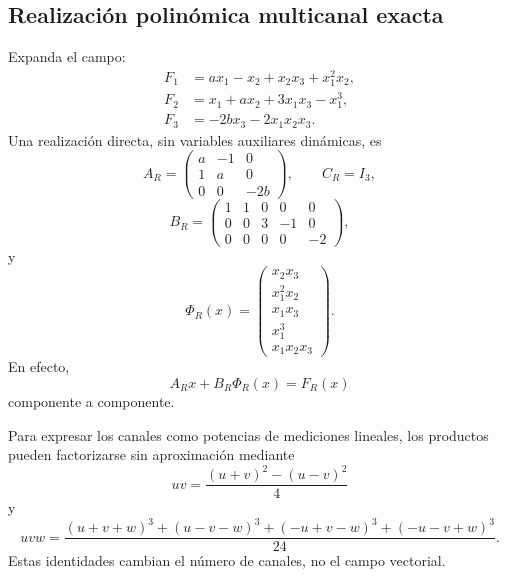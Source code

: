 \subsection{Realización polinómica multicanal exacta}

Expanda el campo:
\begin{align*}
 F_1&=a x_1-x_2+x_2x_3+x_1^2x_2,\\
 F_2&=x_1+a x_2+3x_1x_3-x_1^3,\\
 F_3&=-2b x_3-2x_1x_2x_3.
\end{align*}
Una realización directa, sin variables auxiliares dinámicas, es
\begin{equation}
 A_R=
 \begin{pmatrix}
 a&-1&0\\1&a&0\\0&0&-2b
 \end{pmatrix},\qquad C_R=I_3,
 \label{nc:eq:rf-a}
\end{equation}
\begin{equation}
 B_R=
 \begin{pmatrix}
 1&1&0&0&0\\
 0&0&3&-1&0\\
 0&0&0&0&-2
 \end{pmatrix},
 \label{nc:eq:rf-b}
\end{equation}
y
\begin{equation}
 \Phi_R(x)=
 \begin{pmatrix}
 x_2x_3\\x_1^2x_2\\x_1x_3\\x_1^3\\x_1x_2x_3
 \end{pmatrix}.
 \label{nc:eq:rf-phi}
\end{equation}
En efecto,
\begin{equation}
 A_Rx+B_R\Phi_R(x)=F_R(x)
\end{equation}
componente a componente.

Para expresar los canales como potencias de mediciones lineales, los productos
pueden factorizarse sin aproximación mediante
\begin{equation}
 uv=\frac{(u+v)^2-(u-v)^2}{4}
 \label{nc:eq:square-identity}
\end{equation}
y
\begin{equation}
 uvw=\frac{(u+v+w)^3+(u-v-w)^3+(-u+v-w)^3+(-u-v+w)^3}{24}.
 \label{nc:eq:cubic-identity}
\end{equation}
Estas identidades cambian el número de canales, no el campo vectorial.

